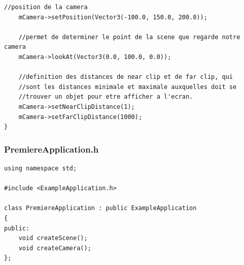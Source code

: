 \begin{lstlisting}[caption={PremiereApplication.cpp: Création de la caméra}]
    //position de la camera
    mCamera->setPosition(Vector3(-100.0, 150.0, 200.0));

    //permet de determiner le point de la scene que regarde notre camera
    mCamera->lookAt(Vector3(0.0, 100.0, 0.0));

    //definition des distances de near clip et de far clip, qui
    //sont les distances minimale et maximale auxquelles doit se
    //trouver un objet pour etre afficher a l'ecran.
    mCamera->setNearClipDistance(1);
    mCamera->setFarClipDistance(1000);
}

\end{lstlisting}



\subsubsection{PremiereApplication.h}
\begin{lstlisting}[caption={PremiereApplication.h: Création de la caméra}]
using namespace std;

#include <ExampleApplication.h>

class PremiereApplication : public ExampleApplication
{
public:
    void createScene();
    void createCamera();
};

\end{lstlisting}


